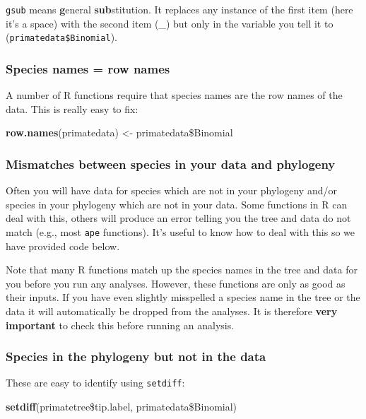 \documentclass[11pt]{article}
\newcommand{\KeywordTok}[1]{\textcolor[rgb]{0.13,0.29,0.53}{\textbf{{#1}}}}
\newcommand{\StringTok}[1]{\textcolor[rgb]{0.31,0.60,0.02}{{#1}}}
\newcommand{\NormalTok}[1]{{#1}}
\begin{document}
\texttt{gsub} means \textbf{g}eneral \textbf{sub}stitution. It replaces any instance of the first item (here it’s a space) with the second item (\_) but only in the variable you tell it to (\texttt{primatedata\$Binomial}).

\subsubsection{Species names = row names}

A number of R functions require that species names are the row names of the data. This is really easy to fix:

\begin{snugshade}
\begin{Highlighting}[]
\KeywordTok{row.names}\NormalTok{(primatedata) <-}\StringTok{ }\NormalTok{primatedata\$Binomial}
\end{Highlighting}
\end{snugshade}

\subsubsection{Mismatches between species in your data and phylogeny}
Often you will have data for species which are not in your phylogeny and/or species in your phylogeny which are not in your data. Some functions in R can deal with this, others will produce an error telling you the tree and data do not match (e.g., most \texttt{ape} functions). It's useful to know how to deal with this so we have provided code below.

\begin{framed}
Note that many R functions match up the species names in the tree and data for you before you run any analyses. However, these functions are only as good as their inputs. If you have even slightly misspelled a species name in the tree or the data it will automatically be dropped from the analyses. It is therefore \textbf{very important} to check this before running an analysis.
\end{framed}

\subsubsection{Species in the phylogeny but not in the data}
These are easy to identify using \texttt{setdiff}:

\begin{snugshade}
\begin{Highlighting}[]
\KeywordTok{setdiff}\NormalTok{(primatetree\$tip.label, primatedata\$Binomial)}
\end{Highlighting}
\end{snugshade}
\end{document}
